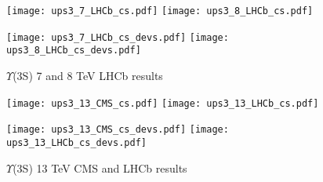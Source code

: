 \documentclass{article}
\begin{document}
\clearpage

\begin{figure}
\centering
\texttt{[image: ups3\_7\_LHCb\_cs.pdf]}
\texttt{[image: ups3\_8\_LHCb\_cs.pdf]}

\texttt{[image: ups3\_7\_LHCb\_cs\_devs.pdf]}
\texttt{[image: ups3\_8\_LHCb\_cs\_devs.pdf]}
\caption{$\Upsilon$(3S) 7 and 8 TeV LHCb results}
\end{figure}

\clearpage

\begin{figure}
\centering
\texttt{[image: ups3\_13\_CMS\_cs.pdf]}
\texttt{[image: ups3\_13\_LHCb\_cs.pdf]}

\texttt{[image: ups3\_13\_CMS\_cs\_devs.pdf]}
\texttt{[image: ups3\_13\_LHCb\_cs\_devs.pdf]}
\caption{$\Upsilon$(3S) 13 TeV CMS and LHCb results}
\end{figure}


\clearpage
\restoregeometry


\end{document}
